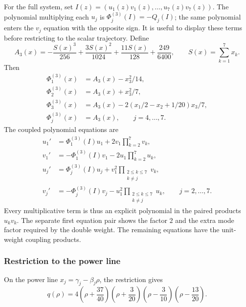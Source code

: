 \documentclass[11pt]{article}
\begin{document}
For the full system, set $I(z)=(u_1(z)v_1(z),\ldots,u_7(z)v_7(z))$. The polynomial multiplying each $u_j$ is $\Phi_j^{(3)}(I)=-Q_j(I)$; the same polynomial enters the $v_j$ equation with the opposite sign. It is useful to display these terms before restricting to the scalar trajectory. Define
\begin{equation}\label{ex:g3-common-phase}
A_3(x)=-\frac{S(x)^3}{256}+\frac{3S(x)^2}{1024}+\frac{11S(x)}{128}+\frac{249}{6400},\qquad S(x)=\sum_{k=1}^7x_k.
\end{equation}
Then
\begin{equation}\label{ex:g3-phases}
\begin{aligned}
\Phi_1^{(3)}(x)&=A_3(x)-x_3^2/14,\\
\Phi_2^{(3)}(x)&=A_3(x)+x_3^2/7,\\
\Phi_3^{(3)}(x)&=A_3(x)-2(x_1/2-x_2+1/20)x_3/7,\\
\Phi_j^{(3)}(x)&=A_3(x),\qquad j=4,\ldots,7.
\end{aligned}
\end{equation}
The coupled polynomial equations are
\begin{equation}\label{ex:g3-coupled}
\begin{aligned}
u_1'&=\Phi_1^{(3)}(I)u_1+2v_1\prod_{k=2}^7v_k,\\
v_1'&=-\Phi_1^{(3)}(I)v_1-2u_1\prod_{k=2}^7u_k,\\
u_j'&=\Phi_j^{(3)}(I)u_j+v_1^2\prod_{\substack{2\le k\le 7\\k\ne j}}v_k,\\
v_j'&=-\Phi_j^{(3)}(I)v_j-u_1^2\prod_{\substack{2\le k\le 7\\k\ne j}}u_k,
\qquad j=2,\ldots,7.
\end{aligned}
\end{equation}
Every multiplicative term is thus an explicit polynomial in the paired products $u_kv_k$. The separate first equation pair shows the factor $2$ and the extra mode factor required by the double weight. The remaining equations have the unit-weight coupling products.

\subsubsection{Restriction to the power line}

On the power line $x_j = \gamma_j - \beta_j\rho$, the restriction gives
\begin{equation}\label{ex:g3-q}
q(\rho) = 4\left(\rho + \frac{37}{40}\right)\left(\rho + \frac{3}{20}\right)\left(\rho - \frac{3}{10}\right)\left(\rho - \frac{13}{20}\right).
\end{equation}
\end{document}

